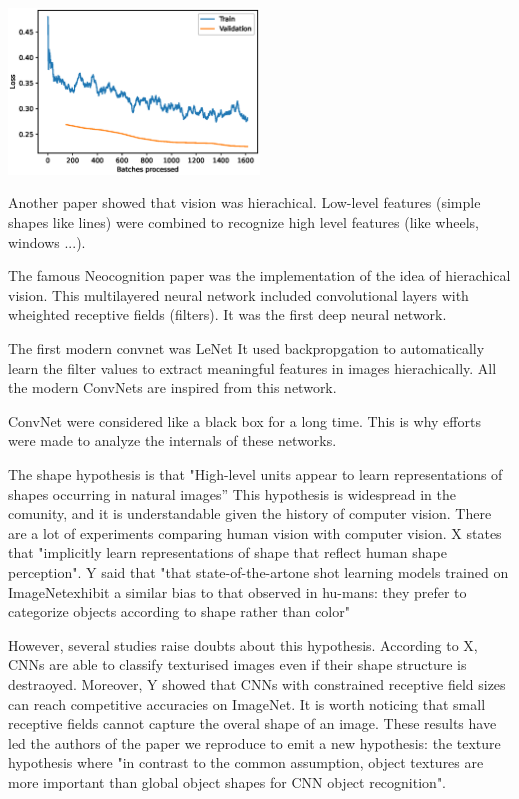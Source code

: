 \documentclass{article}
\begin{document}
\includegraphics[width = 0.5\textwidth]{imgs/sin-in/loss}

Another paper showed that vision was hierachical. Low-level features (simple shapes like lines)
were combined to recognize high level features (like wheels, windows ...).

The famous Neocognition paper was the implementation of the idea of hierachical vision.
This multilayered neural network included convolutional layers with wheighted receptive fields (filters).
It was the first deep neural network.

The first modern convnet was LeNet \cite{Lecun98gradient-basedlearning}
It used backpropgation to automatically learn the filter values to extract meaningful features in images hierachically.
All the modern ConvNets are inspired from this network.

ConvNet were considered like a black box for a long time.
This is why efforts were made to analyze the internals of these networks.

The shape hypothesis is that "High-level units appear to learn
representations of shapes occurring in natural images” \cite{Kriegeskorte029876}
This hypothesis is widespread in the comunity, and
it is understandable given the history of computer vision.
There are a lot of experiments comparing human vision with computer vision.
X states that "implicitly learn representations of shape
 that reflect human shape perception".
Y said that "that  state-of-the-artone  shot  learning  models  trained  on  ImageNetexhibit  a  similar  bias  to  that  observed  in  hu-mans:  
they prefer to categorize objects according  to  shape  rather  than  color" \cite{ritter2017cognitive}

However, several studies raise doubts about this hypothesis.
According to X, CNNs are able to classify texturised images even if their shape structure is destraoyed.
Moreover, Y showed that CNNs with constrained receptive field sizes can reach competitive accuracies on ImageNet.
It is worth noticing that small receptive fields cannot capture the overal shape of an image.
These results have led the authors of the paper we reproduce \cite{geirhos2018imagenettrained} 
to emit a new hypothesis: the texture hypothesis where "in contrast to the
common assumption, object textures are more important than global object shapes for CNN object
recognition".
\end{document}
